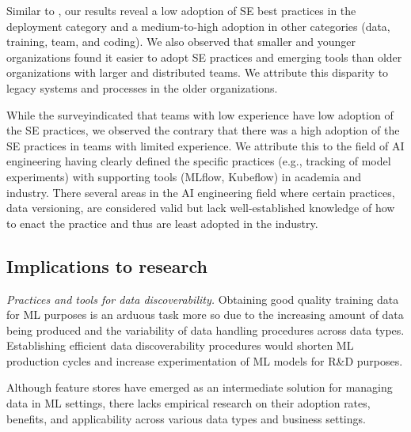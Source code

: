 Similar to \cite{Serban2020Practices}, our results reveal a low adoption of SE best practices in the deployment category and a medium-to-high adoption in other categories (data, training, team, and coding). We also observed that smaller and younger organizations found it easier to adopt SE practices and emerging tools than older organizations with larger and distributed teams. We attribute this disparity to legacy systems and processes in the older organizations.

While the survey\DIFaddbegin {}\DIFaddend indicated that teams with low experience have low adoption of the SE practices, we observed the contrary that there was a high adoption of the SE practices in teams with limited experience. We attribute this \DIFdelbegin {}\DIFdelend to the field of AI engineering having clearly defined the specific practices (e.g., tracking of model experiments) with supporting tools (MLflow, Kubeflow) in academia and industry. There \DIFdelbegin {}\DIFdelend \DIFaddbegin {}\DIFaddend several areas in the AI engineering field where certain practices, \DIFdelbegin {}\DIFdelend \DIFaddbegin {}\DIFaddend data versioning, are considered valid but lack well-established knowledge of how to enact the practice and thus are least adopted in the industry.


\subsection{Implications to research}
\textit{Practices and tools for data discoverability.} Obtaining good quality training data for ML purposes is an arduous task more so due to the increasing amount of data being produced and the variability of data handling procedures across \DIFdelbegin {}\DIFdelend data types. Establishing efficient data discoverability procedures would shorten ML production cycles and increase experimentation of ML models for R\&D purposes.

Although feature stores have emerged as an intermediate solution for managing data in ML settings, there lacks empirical research on their adoption rates, benefits, and applicability across various data types and business settings.%


